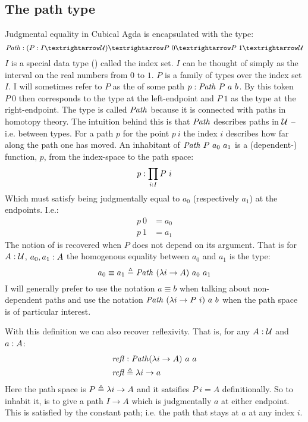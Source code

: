 \subsection{The path type}
Judgmental equality in Cubical Agda is encapsulated with the type:
%
\begin{equation}
\Path \tp (P \tp I → \MCU) → P\ 0 → P\ 1 → \MCU
\end{equation}
%
$I$ is a special data type () called the index set. $I$ can be thought of simply as the interval on
the real numbers from $0$ to $1$. $P$ is a family of types over the index set
$I$. I will sometimes refer to $P$ as the  of some path $p \tp
\Path\ P\ a\ b$. By this token $P\ 0$ then corresponds to the type at the
left-endpoint and $P\ 1$ as the type at the right-endpoint. The type is called
$\Path$ because it is connected with paths in homotopy theory. The intuition
behind this is that $\Path$ describes paths in $\mathcal{U}$ -- i.e. between types. For
a path $p$ for the point $p\ i$ the index $i$ describes how far along the path
one has moved. An inhabitant of $\Path\ P\ a_0\ a_1$ is a (dependent-) function,
$p$, from the index-space to the path space:
%
$$
p \mathrel{:} \prod_{i \mathrel{:} I} P\ i
$$
%
Which must satisfy being judgmentally equal to $a_0$ (respectively $a_1$) at the
endpoints. I.e.:
%
\begin{align*}
  p\ 0 & = a_0 \\
  p\ 1 & = a_1
\end{align*}
%
The notion of  is recovered when $P$ does not
depend on its argument. That is for $A \mathrel{:} \mathcal{U}$, $a_0, a_1 \mathrel{:} A$ the
homogenous equality between $a_0$ and $a_1$ is the type:
%
$$
a_0 \equiv a_1 \defeq \Path\ (\lambda i \to A)\ a_0\ a_1
$$
%
I will generally prefer to use the notation
$a \equiv b$ when talking about non-dependent paths and use the notation
$\Path\ (\lambda i \to P\ i)\ a\ b$ when the path space is of particular
interest.

With this definition we can also recover reflexivity. That is, for any $A \mathrel{:}
\mathcal{U}$ and $a \mathrel{:} A$:
%
\begin{equation}
\begin{aligned}
\refl & \tp \Path (\lambda i \to A)\ a\ a \\
\refl & \defeq \lambda i \to a
\end{aligned}
\end{equation}
%
Here the path space is $P \mathrel{\triangleq} \lambda i \to A$ and it satsifies $P\ i = A$
definitionally. So to inhabit it, is to give a path $I \to A$ which is
judgmentally $a$ at either endpoint. This is satisfied by the constant path;
i.e. the path that stays at $a$ at any index $i$.


